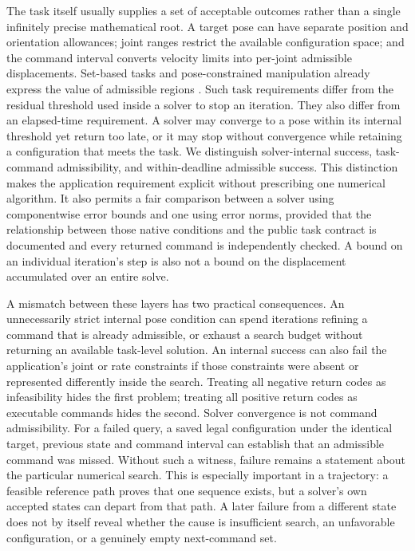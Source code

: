 \documentclass[10pt,a4paper]{article}
\begin{document}
The task itself usually supplies a set of acceptable outcomes rather than a
single infinitely precise mathematical root. A target pose can have separate
position and orientation allowances; joint ranges restrict the available
configuration space; and the command interval converts velocity limits into
per-joint admissible displacements. Set-based tasks and pose-constrained
manipulation already express the value of admissible regions
\cite{moe2016setbased,berenson2011tsr}. Such task requirements differ from the
residual threshold used inside a solver to stop an iteration. They also differ
from an elapsed-time requirement. A solver may converge to a pose within its
internal threshold yet return too late, or it may stop without convergence while
retaining a configuration that meets the task. We distinguish solver-internal
success, task-command admissibility, and within-deadline admissible success.
This distinction makes the application requirement explicit without prescribing
one numerical algorithm. It also permits a fair comparison between a solver
using componentwise error bounds and one using error norms, provided that the
relationship between those native conditions and the public task contract is
documented and every returned command is independently checked. A bound on an
individual iteration's step is also not a bound on the displacement accumulated
over an entire solve.

A mismatch between these layers has two practical consequences. An unnecessarily
strict internal pose condition can spend iterations refining a command that is
already admissible, or exhaust a search budget without returning an available
task-level solution. An internal success can also fail the application's joint
or rate constraints if those constraints were absent or represented differently
inside the search. Treating all negative return codes as infeasibility hides the
first problem; treating all positive return codes as executable commands hides
the second. Solver convergence is not command admissibility.
For a failed query, a saved legal configuration under the identical target,
previous state and command interval can establish that an admissible command
was missed. Without such a witness, failure remains a statement about the
particular numerical search. This is especially important in a trajectory:
a feasible reference path proves that one sequence exists, but a solver's own
accepted states can depart from that path. A later failure from a different
state does not by itself reveal whether the cause is insufficient search,
an unfavorable configuration, or a genuinely empty next-command set.
\end{document}
